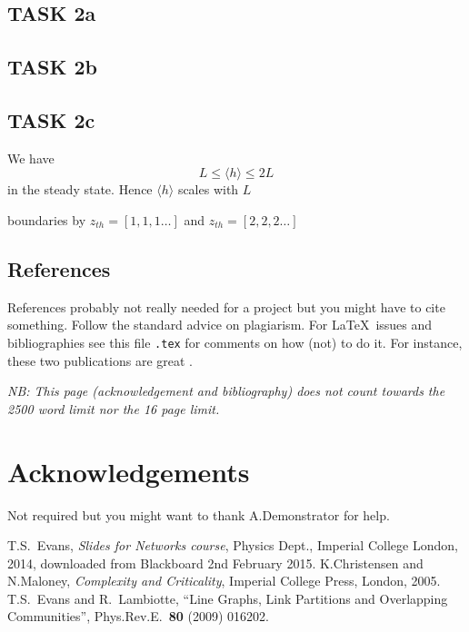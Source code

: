 \documentclass[a4paper,12pt]{article}
\begin{document}
\subsection{TASK 2a}
\subsection{TASK 2b}
\subsection{TASK 2c}
We have
$$L \leq \langle h\rangle \leq 2L$$
in the steady state. Hence $\langle h\rangle$ scales with $L$

boundaries by $z_{th}=[1, 1, 1\dots]$ and $z_{th}=[2, 2, 2\dots]$



\subsection{References}

References probably not really needed for a project but you might have to cite something.  Follow the standard advice on plagiarism.  For \LaTeX\ issues and bibliographies see this file \texttt{{\jobname}.tex} for comments on how (not) to do it. For instance, these two publications are great \cite{KN05,EL09}.

\newpage
\noindent
\emph{NB: This page (acknowledgement and bibliography) does not count towards the 2500 word limit nor the 16 page limit.}
\vspace*{2cm}

\section*{Acknowledgements}

Not required but you might want to thank A.Demonstrator for help.

%
%

\begin{thebibliography}{99}
  T.S.\ Evans, \emph{Slides for Networks course}, Physics Dept., Imperial College London, 2014, downloaded from Blackboard 2nd February 2015.
  K.Christensen and N.Maloney,
  \emph{Complexity and Criticality},
  Imperial College Press, London, 2005.
  T.S.\ Evans and R.\ Lambiotte,
  ``Line Graphs, Link Partitions and Overlapping Communities'',
  Phys.Rev.E.\ \textbf{80} (2009) 016202.
\end{thebibliography}
\end{document}
